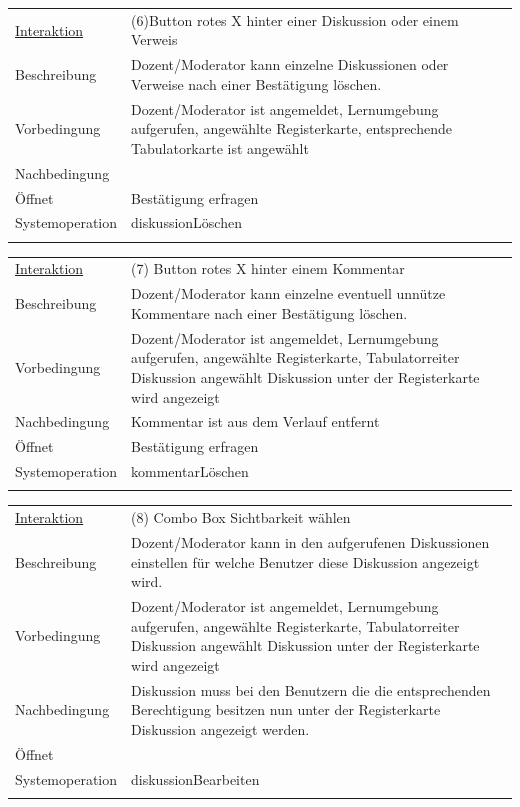 \documentclass[12pt,a4paper]{article}
\begin{document}
{\begin{tabular}{l p{12cm}}
\underline{Interaktion} & (6)Button rotes X hinter einer Diskussion oder einem Verweis\\ 
Beschreibung   	 		& Dozent/Moderator kann einzelne Diskussionen oder Verweise nach einer Bestätigung löschen. \\
Vorbedingung	 		& Dozent/Moderator ist angemeldet, Lernumgebung aufgerufen, angewählte Registerkarte, entsprechende Tabulatorkarte ist angewählt\\
Nachbedingung	 		& \\
Öffnet			 		& \glqq Bestätigung erfragen\grqq \\
Systemoperation & diskussionLöschen \\\\
\end{tabular}

\begin{tabular}{l p{12cm}}
\underline{Interaktion} & (7) Button rotes X hinter einem Kommentar\\ 
Beschreibung   	 		& Dozent/Moderator kann einzelne eventuell unnütze Kommentare nach einer Bestätigung löschen.\\
Vorbedingung	 		&  Dozent/Moderator ist angemeldet, Lernumgebung aufgerufen, angewählte Registerkarte,  Tabulatorreiter Diskussion angewählt Diskussion unter der Registerkarte wird angezeigt\\
Nachbedingung	 		& Kommentar ist aus dem Verlauf entfernt\\
Öffnet			 		& \glqq Bestätigung erfragen\grqq \\
Systemoperation & kommentarLöschen\\\\
\end{tabular}

\begin{tabular}{l p{12cm}}
\underline{Interaktion} & (8) Combo Box  Sichtbarkeit wählen\\ 
Beschreibung   	 		& Dozent/Moderator kann in den aufgerufenen Diskussionen einstellen für welche Benutzer diese Diskussion angezeigt wird.\\
Vorbedingung	 		& Dozent/Moderator ist angemeldet, Lernumgebung aufgerufen, angewählte Registerkarte,  Tabulatorreiter Diskussion angewählt Diskussion unter der Registerkarte wird angezeigt\\
Nachbedingung	 		& Diskussion muss bei den Benutzern die die entsprechenden Berechtigung besitzen nun unter der Registerkarte Diskussion angezeigt werden.\\
Öffnet			 		&  \\
Systemoperation & diskussionBearbeiten\\\\
\end{tabular}

}
\end{document}
